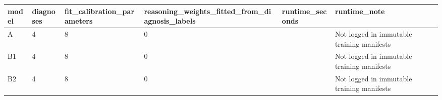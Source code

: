 \begin{tabular}{llllll}
\hline
model & diagnoses & fit\_calibration\_parameters & reasoning\_weights\_fitted\_from\_diagnosis\_labels & runtime\_seconds & runtime\_note \\
\hline
A & 4 & 8 & 0 &  & Not logged in immutable training manifests \\
B1 & 4 & 8 & 0 &  & Not logged in immutable training manifests \\
B2 & 4 & 8 & 0 &  & Not logged in immutable training manifests \\
\hline
\end{tabular}
